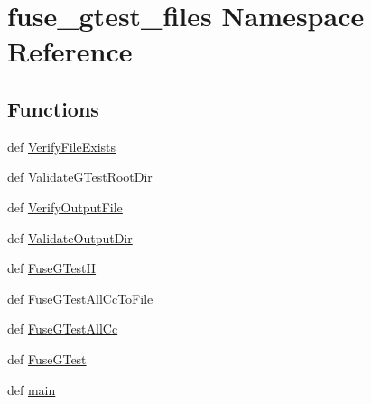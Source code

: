 \hypertarget{namespacefuse__gtest__files}{\section{fuse\-\_\-gtest\-\_\-files \-Namespace \-Reference}
\label{d3/dfa/namespacefuse__gtest__files}
}
\subsection*{\-Functions}
\begin{DoxyCompactItemize}
\item 
def \hyperlink{namespacefuse__gtest__files_a1192ccd4053c7380b9aae5ca1b620665}{\-Verify\-File\-Exists}
\item 
def \hyperlink{namespacefuse__gtest__files_ab9e4a4d901cebc66da1e309705bfcac4}{\-Validate\-G\-Test\-Root\-Dir}
\item 
def \hyperlink{namespacefuse__gtest__files_a144f7340d0a2d0c8fd4981e28720e79a}{\-Verify\-Output\-File}
\item 
def \hyperlink{namespacefuse__gtest__files_a348cabb513c9b46663e68f28487f45b9}{\-Validate\-Output\-Dir}
\item 
def \hyperlink{namespacefuse__gtest__files_acaaf18fcbfe37616311a2ab798f93e88}{\-Fuse\-G\-Test\-H}
\item 
def \hyperlink{namespacefuse__gtest__files_a5bd70f8474de0223e5645df52f5629ee}{\-Fuse\-G\-Test\-All\-Cc\-To\-File}
\item 
def \hyperlink{namespacefuse__gtest__files_a2b13eae2bd8489b27aa4399d9b6e5c5b}{\-Fuse\-G\-Test\-All\-Cc}
\item 
def \hyperlink{namespacefuse__gtest__files_a6fdf9baef71acf9fa935b3f0ca611edc}{\-Fuse\-G\-Test}
\item 
def \hyperlink{namespacefuse__gtest__files_aa2e9cc05cf80b8f56f08eade06b8c9ed}{main}
\end{DoxyCompactItemize}
